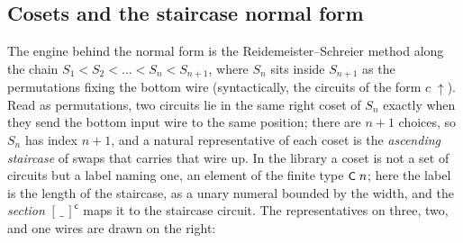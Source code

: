 \subsection{Cosets and the staircase normal form}\label{sec:sn-cosets}

The engine behind the normal form is the Reidemeister--Schreier method
along the chain
$S_1 < S_2 < \dots < S_n < S_{n+1}$, where $S_n$ sits inside $S_{n+1}$ as
the permutations fixing the bottom wire (syntactically, the circuits
of the form $c\;{\uparrow}$).  Read as permutations, two circuits lie in the
same right coset of $S_n$ exactly when they send the bottom input wire
to the same position; there are $n{+}1$ choices, so $S_n$ has index $n{+}1$,
and a natural representative of each coset is the \emph{ascending
staircase} of swaps that carries that wire up.  In the library a coset
is not a set of circuits but a label naming one, an element of the finite type
$\mbox{\textsf{\small C}}\;n$; here the label is the length of the staircase, as a unary
numeral bounded by the width, and the \emph{section} $[\,\_\,]^{\mathsf
c}$ maps it to the staircase circuit.  The representatives on three,
two, and one wires are drawn on the right:

